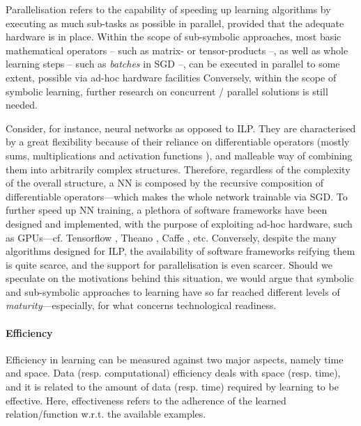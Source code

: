 \documentclass[12pt,a4paper,openright,twoside]{book}
\begin{document}
Parallelisation refers to the capability of speeding up learning algorithms by executing as much sub-tasks as possible in parallel, provided that the adequate hardware is in place.
%
Within the scope of sub-symbolic approaches, most basic mathematical operators -- such as matrix- or tensor-products --, as well as whole learning steps -- such as \emph{batches} in SGD --, can be executed in parallel to some extent, possible via ad-hoc hardware facilities
%
Conversely, within the scope of symbolic learning, further research on concurrent / parallel solutions is still needed.

Consider, for instance, neural networks as opposed to ILP.
%
They are characterised by a great flexibility because of their reliance on differentiable operators (mostly sums, multiplications and activation functions \cite{enwiki:ActivationFunctions}), and malleable way of combining them into arbitrarily complex structures.
%
Therefore, regardless of the complexity of the overall structure, a NN is composed by the recursive composition of differentiable operators---which makes the whole network trainable via SGD.
%
To further speed up NN training, a plethora of software frameworks have been designed and implemented, with the purpose of exploiting ad-hoc hardware, such as GPUs---cf. Tensorflow \cite{tensorflow2015-whitepaper}, Theano \cite{theano2016}, Caffe \cite{JiaSDKLGGD14}, etc.
%
Conversely, despite the many algorithms designed for ILP, the availability of software frameworks reifying them is quite scarce, and the support for parallelisation is even scarcer.
%
Should we speculate on the motivations behind this situation, we would argue that symbolic and sub-symbolic approaches to learning have so far reached different levels of \emph{maturity}---especially, for what concerns technological readiness.


\paragraph{Efficiency}

Efficiency in learning can be measured against two major aspects, namely time and space.
%
Data (resp. computational) efficiency deals with space (resp. time), and it is related to the amount of data (resp. time) required by learning to be effective.
%
%
Here, effectiveness refers to the adherence of the learned relation/function w.r.t. the available examples.
\end{document}
